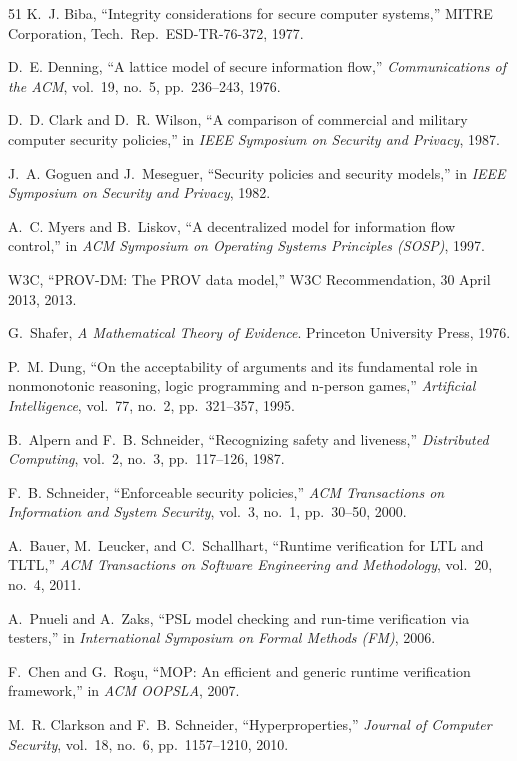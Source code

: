 \documentclass[conference,compsoc]{IEEEtran}
\theoremstyle{definition}
\theoremstyle{plain}
\begin{document}
\begin{thebibliography}{51}
 K.~J. Biba, ``Integrity considerations for secure
computer systems,'' MITRE Corporation, Tech.\ Rep.\ ESD-TR-76-372,
1977.

 D.~E. Denning, ``A lattice model of secure
information flow,'' \emph{Communications of the ACM}, vol.~19,
no.~5, pp.~236--243, 1976.

 D.~D. Clark and D.~R. Wilson, ``A comparison
of commercial and military computer security policies,'' in
\emph{IEEE Symposium on Security and Privacy}, 1987.

 J.~A. Goguen and J.~Meseguer, ``Security policies
and security models,'' in \emph{IEEE Symposium on Security and
Privacy}, 1982.

 A.~C. Myers and B.~Liskov, ``A decentralized
model for information flow control,'' in \emph{ACM Symposium on
Operating Systems Principles (SOSP)}, 1997.

 W3C, ``PROV-DM: The PROV data model,'' W3C
Recommendation, 30 April 2013, 2013.

 G.~Shafer, \emph{A Mathematical Theory of
Evidence}. Princeton University Press, 1976.

 P.~M. Dung, ``On the acceptability of arguments and
its fundamental role in nonmonotonic reasoning, logic programming
and n-person games,'' \emph{Artificial Intelligence}, vol.~77,
no.~2, pp.~321--357, 1995.

 B.~Alpern and F.~B. Schneider, ``Recognizing
safety and liveness,'' \emph{Distributed Computing}, vol.~2,
no.~3, pp.~117--126, 1987.

 F.~B. Schneider, ``Enforceable security
policies,'' \emph{ACM Transactions on Information and System
Security}, vol.~3, no.~1, pp.~30--50, 2000.

 A.~Bauer, M.~Leucker, and C.~Schallhart, ``Runtime
verification for LTL and TLTL,'' \emph{ACM Transactions on
Software Engineering and Methodology}, vol.~20, no.~4, 2011.

 A.~Pnueli and A.~Zaks, ``PSL model checking and
run-time verification via testers,'' in \emph{International
Symposium on Formal Methods (FM)}, 2006.

 F.~Chen and G.~Ro\c{s}u, ``MOP: An efficient and
generic runtime verification framework,'' in \emph{ACM OOPSLA},
2007.

 M.~R. Clarkson and F.~B. Schneider,
``Hyperproperties,'' \emph{Journal of Computer Security},
vol.~18, no.~6, pp.~1157--1210, 2010.


\end{thebibliography}
\end{document}
